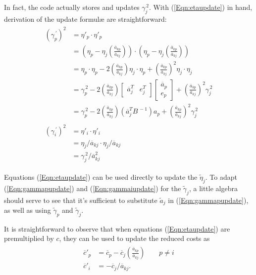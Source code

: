 In fact, the code actually stores and updates $\gamma_j^{\,2}$.
With (\ref{Eqn:etaupdate}) in hand, derivation of the update formul\ae{}
are straightforward:
\begin{align}
\begin{split}
(\gamma^{\,\prime}_p)^2 & = \eta'_p \cdot \eta'_p \\
  & = (\eta_p - \eta_j( \frac{\overline{a}_{kp}}{\overline{a}_{kj}} )) \cdot
      (\eta_p - \eta_j( \frac{\overline{a}_{kp}}{\overline{a}_{kj}} )) \\
  & = \eta_p \cdot \eta_p -
      2( \frac{\overline{a}_{kp}}{\overline{a}_{kj}} )\eta_j \cdot \eta_p +
      ( \frac{\overline{a}_{kp}}{\overline{a}_{kj}} )^2 \eta_j \cdot \eta_j \\
  & = \gamma_p^{\,2} -
      2( \frac{\overline{a}_{kp}}{\overline{a}_{kj}} )
      \begin{bmatrix} \overline{a}^T_j & e^T_j \end{bmatrix}
      \begin{bmatrix} \overline{a}_p \\ e_p \end{bmatrix} +
      ( \frac{\overline{a}_{kp}}{\overline{a}_{kj}} )^2 \gamma_j^{\,2} \\
  & = \gamma_p^{\,2} -
      2( \frac{\overline{a}_{kp}}{\overline{a}_{kj}} )
      (\overline{a}^T_j B^{\,-1}) a_p +
      ( \frac{\overline{a}_{kp}}{\overline{a}_{kj}} )^2 \gamma_j^{\,2}
      \label{Eqn:gammapupdate}
\end{split} \\[.5ex]
\begin{split}
(\gamma^{\,\prime}_i)^2 & = \eta'_i \cdot \eta'_i \\
  & = \eta_j/\overline{a}_{kj} \cdot \eta_j/\overline{a}_{kj} \\
  & = \gamma_j^{\,2}/\overline{a}^2_{kj}  \label{Eqn:gammaiupdate}
\end{split}
\end{align}

Equations (\ref{Eqn:etaupdate}) can be used directly to update the
$\tilde{\eta}_j$.
To adapt (\ref{Eqn:gammapupdate}) and (\ref{Eqn:gammaiupdate}) for the
$\tilde{\gamma}_j$,
a little algebra should serve to see that it's sufficient to substitute
$\tilde{a}_j$ in (\ref{Eqn:gammapupdate}), as well as using
$\tilde{\gamma}_p$ and $\tilde{\gamma}_j$.

It is straightforward to observe that when equations (\ref{Eqn:etaupdate})
are premultiplied by $c$, they can be used to update the reduced costs as
\begin{align*}
\begin{split}
\overline{c}'_p & = \overline{c}_p -
	\overline{c}_j( \frac{\overline{a}_{kp}}{\overline{a}_{kj}} )
\qquad p \neq i \\
\overline{c}'_i & = - \overline{c}_j/\overline{a}_{kj}.
\end{split}
\end{align*}

